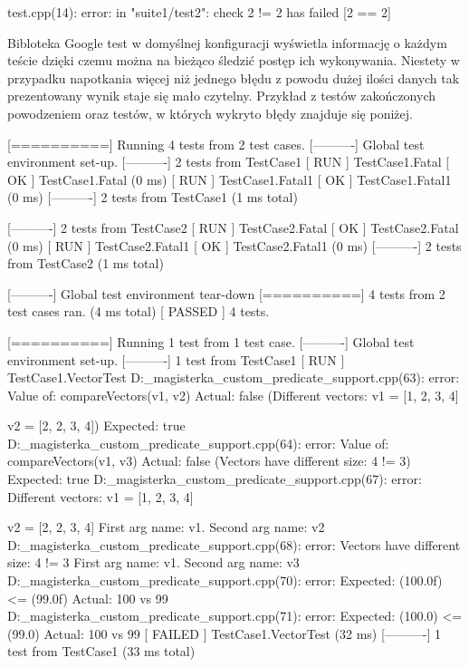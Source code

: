 \documentclass[12pt,a4paper,notitlepage]{report}
\begin{document}
test.cpp(14): error: in "suite1/test2": check 2 != 2 has failed [2 == 2]

Bibloteka Google test w domyślnej konfiguracji wyświetla informację o każdym teście dzięki czemu można na bieżąco śledzić postęp ich wykonywania. Niestety w przypadku napotkania więcej niż jednego błędu z powodu dużej ilości danych tak prezentowany wynik staje się mało czytelny. Przykład z testów zakończonych powodzeniem oraz testów, w których wykryto błędy znajduje się poniżej.

[==========] Running 4 tests from 2 test cases.
[----------] Global test environment set-up.
[----------] 2 tests from TestCase1
[ RUN      ] TestCase1.Fatal
[       OK ] TestCase1.Fatal (0 ms)
[ RUN      ] TestCase1.Fatal1
[       OK ] TestCase1.Fatal1 (0 ms)
[----------] 2 tests from TestCase1 (1 ms total)

[----------] 2 tests from TestCase2
[ RUN      ] TestCase2.Fatal
[       OK ] TestCase2.Fatal (0 ms)
[ RUN      ] TestCase2.Fatal1
[       OK ] TestCase2.Fatal1 (0 ms)
[----------] 2 tests from TestCase2 (1 ms total)

[----------] Global test environment tear-down
[==========] 4 tests from 2 test cases ran. (4 ms total)
[  PASSED  ] 4 tests.


[==========] Running 1 test from 1 test case.
[----------] Global test environment set-up.
[----------] 1 test from TestCase1
[ RUN      ] TestCase1.VectorTest
D:\cmake_magisterka\gtest_custom_predicate_support\test\main.cpp(63): error: Value of: compareVectors(v1, v2)
  Actual: false (Different vectors:
v1 = [1, 2, 3, 4]

v2 = [2, 2, 3, 4])
Expected: true
D:\cmake_magisterka\gtest_custom_predicate_support\test\main.cpp(64): error: Value of: compareVectors(v1, v3)
  Actual: false (Vectors have different size: 4 != 3)
Expected: true
D:\cmake_magisterka\gtest_custom_predicate_support\test\main.cpp(67): error: Different vectors:
v1 = [1, 2, 3, 4]

v2 = [2, 2, 3, 4] First arg name: v1. Second arg name: v2
D:\cmake_magisterka\gtest_custom_predicate_support\test\main.cpp(68): error: Vectors have different size: 4 != 3 First arg name: v1. Second arg name: v3
D:\cmake_magisterka\gtest_custom_predicate_support\test\main.cpp(70): error: Expected: (100.0f) <= (99.0f)
  Actual: 100 vs 99
D:\cmake_magisterka\gtest_custom_predicate_support\test\main.cpp(71): error: Expected: (100.0) <= (99.0)
  Actual: 100 vs 99
[  FAILED  ] TestCase1.VectorTest (32 ms)
[----------] 1 test from TestCase1 (33 ms total)
\end{document}
